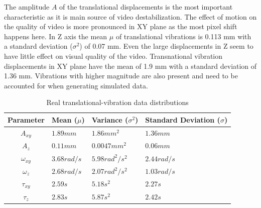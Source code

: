 The amplitude $ A $ of the translational displacements is the most important characteristic as it is main source of video destabilization. The effect of motion on the quality of video is more pronounced in XY plane as the most pixel shift happens here. In Z axis the mean $ \mu $ of translational vibrations is 0.113 mm with a standard deviation ($ \sigma^{2} $) of 0.07 mm. Even the large displacements in Z seem to have little effect on visual quality of the video. Transnational vibration displacements in XY plane have the mean of 1.9 mm with a standard deviation of 1.36 mm. Vibrations with higher magnitude are also present and need to be accounted for when generating simulated data.

\begin{table}[H]
    \centering
\begin{tabular}{| c | L | L | L |}

    \hline
    
     \textbf{Parameter}  & 
     \textbf{Mean ($ \mu $)} & 
     \textbf{Variance ($ \sigma^{2} $)} &
     \textbf{Standard Deviation ($ \sigma $)} \\
     \hline
     
     $ A_{xy} $ & 
     $ 1.89 mm $ & 
     $ 1.86 mm^{2} $ &
     $ 1.36 mm $ \\

      
     $ A_{z} $  & 
     $ 0.11 mm $ & 
     $ 0.0047 mm^{2} $ &
     $ 0.06 mm $ \\
     
     
     $ \omega_{xy} $ & 
     $ 3.68 rad/s $ & 
     $ 5.98 rad^{2}/s^{2} $ &
     $ 2.44 rad/s $ \\
     
     
     $ \omega_{z} $& 
     $ 2.68 rad/s $ & 
     $ 2.07 rad^{2}/s^{2} $ &
     $ 1.03 rad/s $ \\

     
     $ \tau_{xy} $ & 
     $ 2.59 s $ & 
     $ 5.18 s^{2} $ &
     $ 2.27 s $ \\


     $ \tau_{z} $ & 
     $ 2.83 s $ & 
     $ 5.87 s^{2} $ &
     $ 2.42 s $ \\

    \hline

\end{tabular}
    \caption{Real translational-vibration data distributions}
    \label{tab:real_data_analysis_displacement}
\end{table}

